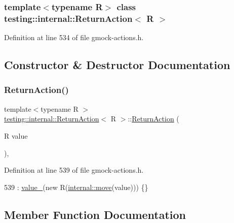 \subsubsection*{template$<$typename R$>$\newline
class testing\+::internal\+::\+Return\+Action$<$ R $>$}



Definition at line 534 of file gmock-\/actions.\+h.



\subsection{Constructor \& Destructor Documentation}
\mbox{\label{classtesting_1_1internal_1_1ReturnAction_af65344e503dae3ab36b4fd6d1ede6fb7}} 
\subsubsection{\texorpdfstring{Return\+Action()}{ReturnAction()}}
{\footnotesize\ttfamily template$<$typename R $>$ \\
\hyperlink{classtesting_1_1internal_1_1ReturnAction}{testing\+::internal\+::\+Return\+Action}$<$ R $>$\+::\hyperlink{classtesting_1_1internal_1_1ReturnAction}{Return\+Action} (\begin{DoxyParamCaption}\item[{R}]{value }\end{DoxyParamCaption})\hspace{0.3cm}{\ttfamily [inline]}, {\ttfamily [explicit]}}



Definition at line 539 of file gmock-\/actions.\+h.


\begin{DoxyCode}
539 : \hyperlink{classtesting_1_1internal_1_1ReturnAction_a321f509b255d1651234f53e8b064d98d}{value\_}(\textcolor{keyword}{new} R(\hyperlink{namespacetesting_1_1internal_a0f6d06bf8c3093b9c22bb08723db201e}{internal::move}(value))) \{\}
\end{DoxyCode}


\subsection{Member Function Documentation}
\mbox{\label{classtesting_1_1internal_1_1ReturnAction_a213aa7089e1caf147a736aa283789045}} 
